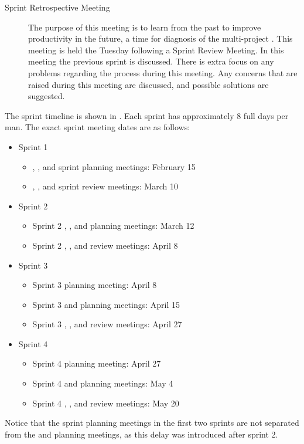 \begin{description}
\begin{description}
  \end{description}
  \item[Sprint Retrospective Meeting]  The purpose of this meeting is to learn from the past to improve productivity in the future, a time for diagnosis of the multi-project \cite{scrumChecklist}. This meeting is held the Tuesday following a Sprint Review Meeting. In this meeting the previous sprint is discussed. There is extra focus on any problems regarding the process during this meeting. Any concerns that are raised during this meeting are discussed, and possible solutions are suggested.
\end{description}

The sprint timeline is shown in . Each sprint has approximately 8 full days per man. The exact sprint meeting dates are as follows:
\begin{itemize}
  \item Sprint 1
  \begin{itemize}
    \item \gui{}, \db{}, and \bd{} sprint planning meetings: February 15
    \item \gui{}, \db{}, and \bd{} sprint review meetings: March 10
  \end{itemize}
  \item Sprint 2
  \begin{itemize}
    \item Sprint 2 \gui{}, \db{}, and \bd{} planning meetings: March 12
    \item Sprint 2 \gui{}, \db{}, and \bd{} review meetings: April 8
  \end{itemize}
  \item Sprint 3
  \begin{itemize}
    \item Sprint 3 \gui{} planning meeting: April 8
    \item Sprint 3 \db{} and \bd{} planning meetings: April 15
    \item Sprint 3 \gui{}, \db{}, and \bd{} review meetings: April 27
  \end{itemize}
  \item Sprint 4
  \begin{itemize}
    \item Sprint 4 \gui{} planning meeting: April 27
    \item Sprint 4 \db{} and \bd{} planning meetings: May 4
    \item Sprint 4 \gui{}, \db{}, and \bd{} review meetings: May 20
  \end{itemize}
\end{itemize}
Notice that the \gui{} sprint planning meetings in the first two sprints are not separated from the \db{} and \bd{} planning meetings, as this delay was introduced after sprint 2.

